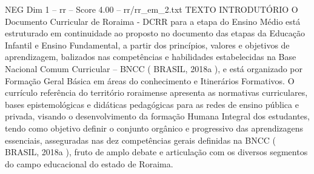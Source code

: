 \begin{textsample}{NEG Dim 1 – rr – Score 4.00 – rr/rr\_em\_2.txt}  \label{ex:f1_neg_078}
TEXTO INTRODUTÓRIO O Documento Curricular de Roraima - DCRR para a etapa do Ensino Médio está estruturado em continuidade ao proposto no documento das etapas da Educação Infantil e Ensino Fundamental, a partir dos princípios, valores e objetivos de aprendizagem, balizados nas competências e habilidades estabelecidas na Base Nacional Comum Curricular – BNCC ( BRASIL, 2018a ), e está organizado por Formação Geral Básica em áreas do conhecimento e Itinerários Formativos.
O currículo referência do território roraimense apresenta as normativas curriculares, bases epistemológicas e didáticas pedagógicas para as redes de ensino pública e privada, visando o desenvolvimento da formação Humana Integral dos estudantes, tendo como objetivo definir o conjunto orgânico e progressivo das aprendizagens essenciais, asseguradas nas dez competências gerais definidas na BNCC ( BRASIL, 2018a ), fruto de amplo debate e articulação com os diversos segmentos do campo educacional do estado de Roraima.

\end{textsample}
